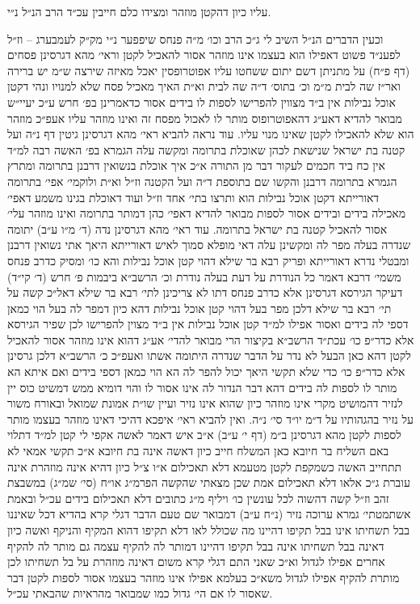 \documentclass[12pt, openany]{book}
\begin{document}
\begin{multicols}{2}
עליו כיון דהקטן מוזהר ומצידו כלם חייבין עכ״ד הרב הנ״ל נ״י.\\\vspace{0pt}

וכעין הדברים הנ״ל השיב לי ג״כ הרב וכו׳ מ״ה פנחס שיפפער נ״י מק״ק לעמבערג – וז״ל לפענ״ד פשוט דאפילו הוא בעצמו אינו מוזהר אסור להאכיל לקטן וראי׳ מהא דגרסינן פסחים (דף פ״ח) על מתניתן דשם יתום ששחטו עליו אפוטרופסין יאכל מאיזה שירצה ש״מ יש ברירה ואר״ז שה לבית מ״מ וכ׳ בתוס׳ ד״ה שה לבית וא״ת האיך מאכיל פסח שלא למנויו ונהי דקטן אוכל נבילות אין ב״ד מצווין להפרישו לספות לו בידים אסור כדאמרינן בפ׳ חרש ע״כ יעיי״ש מבואר להדיא דאע״ג דהאפוטרופוס מותר לו לאכול מפסח זה ואינו מוזהר עליו אעפ״כ מוזהר הוא שלא להאכילו לקטן שאינו מנוי עליו. עוד נראה להביא ראי׳ מהא דגרסינן גיטין דף נ״ה ועל קטנה בת ישראל שנישאת לכהן שאוכלת בתרומה ומקשה עלה הגמרא בפ׳ האשה רבה למ״ד אין כח ביד חכמים לעקור דבר מן התורה א״כ איך אוכלת בנשואין דרבנן בתרומה ומתרץ הגמרא בתרומה דרבנן והקשו שם בתוספת ד״ה ועל הקטנה וז״ל וא״ת ולוקמי׳ אפי׳ בתרומה דאורייתא דקטן אוכל נבילות הוא ותרצו בתי׳ אחד וז״ל ועוד דאוכלת בגינו משמע דאפי׳ מאכילה בידים ובידים אסור לספות מבואר להדיא דאפי׳ כהן דמותר בתרומה ואינו מוזהר עלי׳ אסור להאכיל קטנה בת ישראל בתרומה. עוד ראי׳ מהא דגרסינן נדה (ד׳ מ״ו ע״ב) יתומה שנדרה בעלה מפר לה ומקשינן עלה דאי מופלא סמוך לאיש דאורייתא היאך אתי נשואין דרבנן ומבטלי נדרא דאורייתא ופריק רבא בר שילא דהוי קטן אוכל נבילות והא כו׳ ומסיק כדרב פנחס משמי׳ דרבא דאמר כל הנודרת על דעת בעלה נודרת וכ׳ הרשב״א ביבמות פ׳ חרש (ד׳ קי״ד) דעיקר הגירסא דגרסינן אלא כדרב פנחס דתו לא צריכינן לתי׳ רבא בר שילא דאל״כ קשה על תי׳ רבא בר שילא דלכן מפר בעל דהוי קטן אוכל נבילות דהא כיון דמפר לה בעל הוי כמאן דספי לה בידים ואסור אפילו למ״ד קטן אוכל נבילות אין ב״ד מצוין להפרישו לכן שפיר הגירסא אלא כדר״פ כו׳ עכת״ד הרשב״א בקיצור הרי מבואר להדי׳ אע״ג דהוא אינו מוזהר אסור להאכיל לקטן דהא כאן הבעל לא נדר על הדבר שנדרה היתומה אשתו ואעפ״כ כ׳ הרשב״א דלכן גרסינן אלא כדר״פ כו׳ כדי שלא תקשי היאך יכול להפר לה הא הוי כמאן דספי בידים ואם איתא הא מותר לו לספות לה בידים דהא דבר הנדור לה אינו אסור לו והוי דומיא ממש דמשיט כוס יין לנזיר דהמושיט מקרי אינו מוזהר כיון שהוא אינו נזיר ועיין שו״ת אמונת שמואל ובאורח משור על נזיר בהגהותיו על ד״מ יו״ד סי׳ נ״ה. ואין להביא ראי׳ איפכא דהיכי דאינו מוזהר בעצמו מותר לספות לקטן מהא דגרסינן ב״מ (דף י׳ ע״ב) א״ב איש דאמר לאשה אקפי לי קטן למ״ד דתלוי באם השליח בר חיובא כאן המשלח חייב כיון דאשה אינה בת חיובא א״כ תקשי אמאי לא תתחייב האשה כשמקפת לקטן מטעמא דלא תאכילום א״ו צ״ל כיון דהיא אינה מוזהרת אינה עוברת ג״כ אלאו דלא תאכילום אמת שכן מצאתי שהקשה הפרמ״ג או״ח (סי׳ שמ״ג) במשבצת זהב וז״ל קשה דהשוה לכל עונשין כו׳ ויליף מ״ג כתובים דלא תאכילום בידים עכ״ל ובאמת אשתמטתי׳ גמרא ערוכה נזיר (נ״ח ע״ב) דמבואר שם טעם הדבר דגלי קרא בהדיא דכל שאיננו בבל תשחיתו אינו בבל תקיפו דהיינו מה שכולל לאו דלא תקיפו דהוא המקיף והניקף ואשה כיון דאינה בבל תשחיתו אינה בבל תקיפו דהיינו דמותר לה להקיף עצמה גם מותר לה להקיף אחרים אפילו לגדול וא״כ שאני התם דגלי קרא משום דאינה מוזהרת על בל תשחיתו לכן מותרת להקיף אפילו לגדול משא״כ בעלמא אפילו אינו מוזהר בעצמו אסור לספות לקטן דבר שאסור לו אם הי׳ גדול כמו שמבואר מהראיות שהבאתי עכ״ל.\\\vspace{0pt}


\end{multicols}
\end{document}
